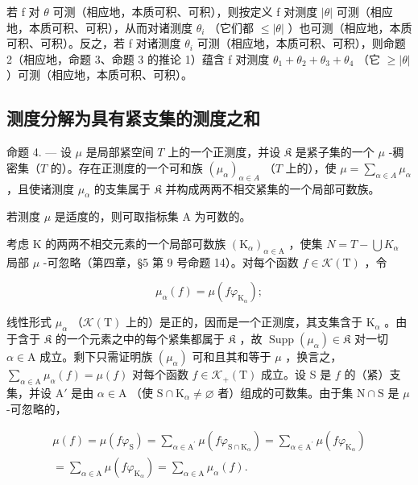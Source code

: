 若 f 对 \(\theta\) 可测（相应地，本质可积、可积），则按定义 f 对测度 \(|\theta|\) 可测（相应地，本质可积、可积），从而对诸测度 \(\theta_{i}\) （它们都 \(\leqslant |\theta|\) ）也可测（相应地，本质可积、可积）。反之，若 f 对诸测度 \(\theta_{i}\) 可测（相应地，本质可积、可积），则命题 2（相应地，命题 3、命题 3 的推论 1）蕴含 f 对测度 \(\theta_{1} + \theta_{2} + \theta_{3} + \theta_{4}\) （它 \(\geqslant |\theta|\) ）可测（相应地，本质可积、可积）。

\subsection{测度分解为具有紧支集的测度之和}

命题 4. --- 设 \(\mu\) 是局部紧空间 \(T\) 上的一个正测度，并设 \(\mathfrak{K}\) 是紧子集的一个 \(\mu\) -稠密集（\(T\) 的）。存在正测度的一个可和族 \((\mu_{\alpha})_{\alpha \in A}\) （\(T\) 上的），使 \(\mu = \sum_{\alpha \in A} \mu_{\alpha}\) ，且使诸测度 \(\mu_{\alpha}\) 的支集属于 \(\mathfrak{K}\) 并构成两两不相交紧集的一个局部可数族。

若测度 \(\mu\) 是适度的，则可取指标集 A 为可数的。

考虑 K 的两两不相交元素的一个局部可数族 \((\mathrm{K}_{\alpha})_{\alpha\in\mathrm{A}}\) ，使集 \(N = T - \bigcup K_{\alpha}\) 局部 \(\mu\) -可忽略（第四章，§5 第 9 号命题 14）。对每个函数 \(f \in \mathcal{K}(\mathrm{T})\) ，令

\[
\mu_ {\alpha} (f) = \mu (f \varphi_ {\mathrm{K} _ {\alpha}});
\]

线性形式 \(\mu_{\alpha}\) （\(\mathcal{K}(\mathrm{T})\) 上的）是正的，因而是一个正测度，其支集含于 \(\mathrm{K}_{\alpha}\) 。由于含于 \(\mathfrak{K}\) 的一个元素之中的每个紧集都属于 \(\mathfrak{K}\) ，故 \(\operatorname{Supp}(\mu_{\alpha}) \in \mathfrak{K}\) 对一切 \(\alpha \in \mathrm{A}\) 成立。剩下只需证明族 \((\mu_{\alpha})\) 可和且其和等于 \(\mu\) ，换言之，\(\sum_{\alpha \in \mathrm{A}} \mu_{\alpha}(f) = \mu(f)\) 对每个函数 \(f \in \mathcal{K}_{+}(\mathrm{T})\) 成立。设 S 是 \(f\) 的（紧）支集，并设 \(\mathrm{A}'\) 是由 \(\alpha \in \mathrm{A}\) （使 \(\mathrm{S} \cap \mathrm{K}_{\alpha} \neq \varnothing\) 者）组成的可数集。由于集 \(\mathrm{N} \cap \mathrm{S}\) 是 \(\mu\) -可忽略的，

\[
\begin{array}{c} \mu (f) = \mu (f \varphi_ {\mathrm{S}}) = \sum_ {\alpha \in \mathrm{A} ^ {\prime}} \mu (f \varphi_ {\mathrm{S} \cap \mathrm{K} _ {\alpha}}) = \sum_ {\alpha \in \mathrm{A} ^ {\prime}} \mu (f \varphi_ {\mathrm{K} _ {\alpha}}) \\ = \sum_ {\alpha \in \mathrm{A}} \mu (f \varphi_ {\mathrm{K} _ {\alpha}}) = \sum_ {\alpha \in \mathrm{A}} \mu_ {\alpha} (f). \end{array}
\]

